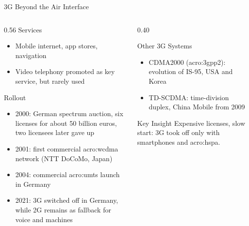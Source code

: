 \begin{frame}{3G Beyond the Air Interface}
  \begin{columns}[T,onlytextwidth]
    \begin{column}{0.56\textwidth}
      Services
      \begin{itemize}
        \item Mobile internet, app stores, navigation
        \item Video telephony promoted as key service, but rarely used
      \end{itemize}
      \vspace{0.4em}
      Rollout
      \begin{itemize}
        \item 2000: German spectrum auction, six licenses for about 50 billion euros, two licensees later gave up~\cite{grimm-umts-auction,teltarif-umts-2004}
        \item 2001: first commercial \gls{acro:wcdma} network (NTT DoCoMo, Japan)~\cite{holma-wcdma}
        \item 2004: commercial \gls{acro:umts} launch in Germany~\cite{macwelt-vodafone-umts}
        \item 2021: 3G switched off in Germany, while 2G remains as fallback for voice and machines~\cite{bundestag-3g}
      \end{itemize}
    \end{column}
    \begin{column}{0.40\textwidth}
      \begin{block}{Other 3G Systems}
        \begin{itemize}
          \item CDMA2000 (\gls{acro:3gpp2}): evolution of IS-95, USA and Korea
          \item TD-SCDMA: time-division duplex, China Mobile from 2009~\cite{stewart-china}
        \end{itemize}
      \end{block}
      \begin{alertblock}{Key Insight}
        Expensive licenses, slow start: 3G took off only with smartphones and \gls{acro:hspa}.
      \end{alertblock}
    \end{column}
  \end{columns}
\end{frame}

